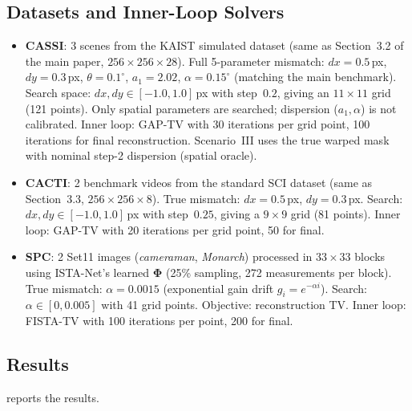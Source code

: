 \documentclass[runningheads]{llncs}
\begin{document}
\subsection{Datasets and Inner-Loop Solvers}

\begin{itemize}
    \item \textbf{CASSI}: 3 scenes from the KAIST simulated dataset (same as Section~3.2 of the main paper, $256 \times 256 \times 28$). Full 5-parameter mismatch: $dx{=}0.5$\,px, $dy{=}0.3$\,px, $\theta{=}0.1^\circ$, $a_1{=}2.02$, $\alpha{=}0.15^\circ$ (matching the main benchmark). Search space: $dx, dy \in [-1.0, 1.0]$\,px with step~$0.2$, giving an $11 \times 11$ grid (121 points). Only spatial parameters are searched; dispersion ($a_1, \alpha$) is not calibrated. Inner loop: GAP-TV with 30 iterations per grid point, 100 iterations for final reconstruction. Scenario~III uses the true warped mask with nominal step-2 dispersion (spatial oracle).
    \item \textbf{CACTI}: 2 benchmark videos from the standard SCI dataset (same as Section~3.3, $256 \times 256 \times 8$). True mismatch: $dx{=}0.5$\,px, $dy{=}0.3$\,px. Search: $dx, dy \in [-1.0, 1.0]$\,px with step~$0.25$, giving a $9 \times 9$ grid (81 points). Inner loop: GAP-TV with 20 iterations per grid point, 50 for final.
    \item \textbf{SPC}: 2 Set11 images (\textit{cameraman}, \textit{Monarch}) processed in $33 \times 33$ blocks using ISTA-Net's learned $\mathbf{\Phi}$ (25\% sampling, 272 measurements per block). True mismatch: $\alpha{=}0.0015$ (exponential gain drift $g_i = e^{-\alpha i}$). Search: $\alpha \in [0, 0.005]$ with 41 grid points. Objective: reconstruction TV. Inner loop: FISTA-TV with 100 iterations per point, 200 for final.
\end{itemize}

\subsection{Results}

 reports the results.
\end{document}

